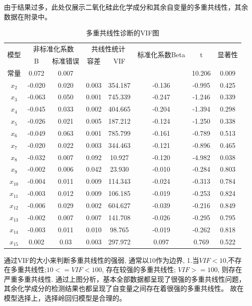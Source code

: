\documentclass[UTF8]{ctexart}
\begin{document}
由于结果过多，此处仅展示二氧化硅此化学成分和其余自变量的多重共线性，其余数据在附录中。
\begin{table}[H]
    \centering
	\caption{多重共线性诊断的VIF图}
    \begin{tabular}{|c|c|c|c|c|c|c|c|} \hline
	\multirow{2}{*}{模型} & \multicolumn{2}{|c|}{非标准化系数} & \multicolumn{2}{|c|}{共线性统计} & \multirow{2}{*}{标准化系数Beta} & \multirow{2}{*}{t} & \multirow{2}{*}{显著性} \\ \cline{2-5}
	~ & B & 标准错误 & 容差 & VIF &  &  &  \\ \hline
	常量 & 0.072 & 0.007 & ~ & ~ & ~ & 10.206 & 0.009 \\ \hline
    $x_{2}$ & -0.020 & 0.020 & 0.003 & 354.187 & -0.136 & -0.995 & 0.425 \\ \hline
    $x_{3}$ & -0.063 & 0.050 & 0.001 & 745.339 & -0.247 & -1.246 & 0.339 \\ \hline
	$x_{4}$ & -0.045 & 0.033 & 0.002 & 404.665 & -0.204 & -1.394 & 0.298 \\ \hline
    $x_{5}$ & -0.026 & 0.021 & 0.005 & 187.212 & -0.124 & -1.250 & 0.338 \\ \hline
    $x_{6}$ & -0.049 & 0.063 & 0.001 & 785.799 & -0.161 & -0.789 & 0.513 \\ \hline
    $x_{7}$ & -0.020 & 0.022 & 0.003 & 344.463 & -0.121 & -0.896 & 0.465 \\ \hline
    $x_{8}$ & -0.032 & 0.007 & 0.092 & 10.927 & -0.120 & -4.982 & 0.038 \\ \hline
    $x_{9}$ & -0.002 & 0.006 & 0.042 & 23.930 & -0.010 & -0.284 & 0.803 \\ \hline
    $x_{10}$ & -0.004 & 0.011 & 0.009 & 114.343 & -0.024 & -0.313 & 0.784 \\ \hline
    $x_{11}$ & -0.003 & 0.012 & 0.009 & 106.185 & -0.019 & -0.253 & 0.824 \\ \hline
	$x_{12}$ & -0.006 & 0.029 & 0.002 & 604.627 & -0.039 & -0.216 & 0.849 \\ \hline
	$x_{13}$ & -0.002 & 0.007 & 0.007 & 141.708 & -0.026 & -0.295 & 0.795 \\ \hline
	$x_{14}$ & -0.003 & 0.011 & 0.010 & 98.765 & -0.019 & -0.262 & 0.818 \\ \hline
	$x_{15}$ & 0.002 & 0.03 & 0.003 & 297.972 & 0.097 & 0.769 & 0.522 \\ \hline
    \end{tabular}
\end{table}

通过VIF的大小来判断多重共线性的强弱, 通常以10作为边界, 1.当$VIF<10$,不存在多重共线性;$10<=VIF<100$, 存在较强的多重共线性; $VIF>=100$, 则存在严重多重共线性.
通过上图分析，基本全部数据都呈现了很强的多重共线性问题，其余化学成分的检测结果也都呈现了自变量之间存在着很强的多重共线性。
故在模型选择上，选择岭回归模型是合理的。
\end{document}
